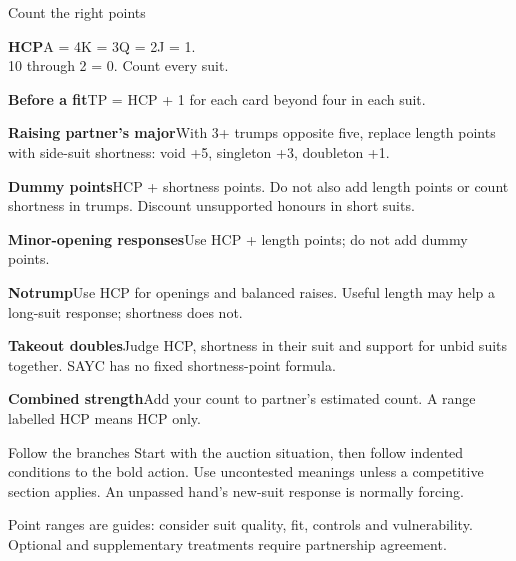 \documentclass[10pt,letterpaper]{article}
\newcommand{\entry}[2]{\par\noindent\textbf{#1}\enspace #2\par\vspace{4.5pt}}
\begin{document}
\begin{minipage}[t]{0.485\textwidth}\vspace{0pt}

\begin{guidecard}{Count the right points}
\entry{HCP}{A = 4\quad K = 3\quad Q = 2\quad J = 1.\\10 through 2 = 0. Count every suit.}
\entry{Before a fit}{TP = HCP + 1 for each card beyond four in each suit.}
\entry{Raising partner's major}{With 3+ trumps opposite five, replace length points with side-suit shortness: void +5, singleton +3, doubleton +1.}
\entry{Dummy points}{HCP + shortness points. Do not also add length points or count shortness in trumps. Discount unsupported honours in short suits.}
\entry{Minor-opening responses}{Use HCP + length points; do not add dummy points.}
\entry{Notrump}{Use HCP for openings and balanced raises. Useful length may help a long-suit response; shortness does not.}
\entry{Takeout doubles}{Judge HCP, shortness in their suit and support for unbid suits together. SAYC has no fixed shortness-point formula.}
\entry{Combined strength}{Add your count to partner's estimated count. A range labelled HCP means HCP only.}
\end{guidecard}

\begin{guidecard}{Follow the branches}
Start with the auction situation, then follow indented conditions to the bold action. Use uncontested meanings unless a competitive section applies. An unpassed hand's new-suit response is normally forcing.\par\smallskip
Point ranges are guides: consider suit quality, fit, controls and vulnerability. Optional and supplementary treatments require partnership agreement.
\end{guidecard}

\end{minipage}
\end{document}
